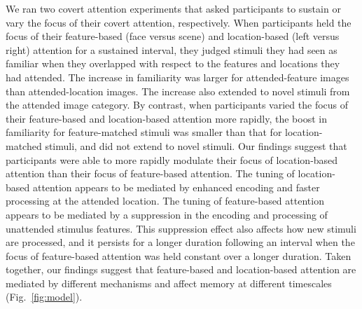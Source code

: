 \documentclass[english]{article}
\begin{document}
We ran two covert attention experiments that asked participants to sustain or
vary the focus of their covert attention, respectively. When participants held
the focus of their feature-based (face versus scene) and location-based (left
versus right) attention for a sustained interval, they judged stimuli they had
seen as familiar when they overlapped with respect to the features and
locations they had attended. The increase in familiarity was larger for
attended-feature images than attended-location images. The increase also
extended to novel stimuli from the attended image category. By contrast, when
participants varied the focus of their feature-based and location-based
attention more rapidly, the boost in familiarity for feature-matched stimuli
was smaller than that for location-matched stimuli, and did not extend to novel
stimuli. Our findings suggest that participants were able to more rapidly
modulate their focus of location-based attention than their focus of
feature-based attention. The tuning of location-based attention appears to be
mediated by enhanced encoding and faster processing at the attended location.
The tuning of feature-based attention appears to be mediated by a suppression
in the encoding and processing of unattended stimulus features. This
suppression effect also affects how new stimuli are processed, and it persists
for a longer duration following an interval when the focus of feature-based
attention was held constant over a longer duration. Taken together, our
findings suggest that feature-based and location-based attention are mediated
by different mechanisms and affect memory at different timescales
(Fig.~\ref{fig:model}).


\end{document}

